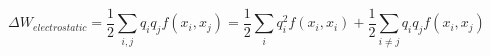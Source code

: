 \begin{equation}
{\Delta}W_{electrostatic} = 
\frac{1}{2} \sum_{i,j}q_{i}q_{j}f(x_{i},x_{j}) = 
\frac{1}{2} \sum_{i}q^{2}_{i}f(x_{i},x_{i}) + \frac{1}{2} \sum_{i \neq j}q_{i}q_{j}f(x_{i},x_{j}) 
\end{equation}
